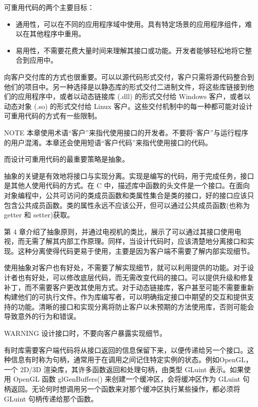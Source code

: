 
可重用代码的两个主要目标：

\begin{itemize}
\item
通用性，可以在不同的应用程序域中使用。具有特定场景的应用程序组件，难以在其他程序中重用。

\item
易用性，不需要花费大量时间来理解其接口或功能。开发者能够轻松地将它整合到应用中。
\end{itemize}

向客户交付库的方式也很重要。可以以源代码形式交付，客户只需将源代码整合到他们的项目中。另一种选择是以静态库的形式交付二进制文件，将这些库链接到他们的应用程序中，或者以动态链接库 (.dll) 的形式交付给 Windows 客户，或者以动态对象 (.so) 的形式交付给 Linux 客户。这些交付机制中的每一种都可能对设计可重用代码的方式有一些限制。

\begin{myNotic}{NOTE}
本章使用术语“客户”来指代使用接口的开发者。不要将“客户”与运行程序的用户混淆。本章还会使用短语“客户代码”来指代使用接口的代码。
\end{myNotic}

而设计可重用代码的最重要策略是抽象。


抽象的关键是有效地将接口与实现分离。实现是编写的代码，用于完成任务，接口是其他人使用代码的方式。在 C 中，描述库中函数的头文件是一个接口。在面向对象编程中，公共可访问的类成员函数和类属性集合是类的接口，好的接口应该只包含公共成员函数。类的属性永远不应该公开，但可以通过公共成员函数(也称为 getter 和 setter)获取。

第 4 章介绍了抽象原则，并通过电视机的类比，展示了可以通过其接口使用电视，而无需了解其内部工作原理。同样，当设计代码时，应该清楚地分离接口和实现。这种分离使得代码更易于使用，主要是因为客户端不需要了解内部实现细节。

使用抽象对客户也有好处，不需要了解实现细节，就可以利用提供的功能。对于设计者也有好处，可以修改底层代码，而无需改变代码的接口。可以提供升级和修复补丁，而不需要客户更改其使用方式。对于动态链接库，客户甚至可能不需要重新构建他们的可执行文件。作为库编写者，可以明确指定接口中期望的交互和提供支持的功能。清晰的接口和实现分离将防止客户以未预期的方法使用库，否则可能会导致意外的行为和错误。

\begin{myWarning}{WARNING}
设计接口时，不要向客户暴露实现细节。
\end{myWarning}

有时库需要客户端代码将从接口返回的信息保留下来，以便传递给另一个接口。这种信息有时称为句柄，通常用于在调用之间记住特定实例的状态。例如OpenGL，一个 2D/3D 渲染库，其许多函数返回和处理句柄，由类型 GLuint 表示。如果使用 OpenGL 函数 glGenBuffers() 来创建一个缓冲区，会将缓冲区作为 GLuint 句柄返回。无论何时想调用另一个函数来对那个缓冲区执行某些操作，都必须将 GLuint 句柄传递给那个函数。

